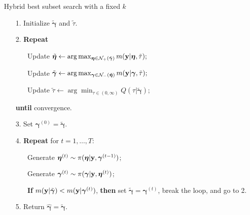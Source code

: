\documentclass[12pt]{article}
\def\uy{{\bf y}}
\def\bg{{\boldsymbol \gamma}}
\def\ueta{{\boldsymbol \eta}}
\def\ueta{{\boldsymbol \eta}}
\begin{document}
\begin{algorithm}[ht]
\caption{Hybrid best subset search with a fixed $k$}\label{alg:2}
\begin{itemize}
\item[1.] Initialize $\tilde{\bg}$ and $\tilde{\tau}$.
\item[2.] \textbf{Repeat}
\begin{itemize}
\item[] Update $\tilde{\ueta}\leftarrow \arg\max_{\ueta  \in \mathcal{N}_+(\tilde{\bg} ) } m(\uy|\ueta,\tilde{\tau});$ 
\item[] Update $\tilde{\bg}\leftarrow  \arg\max_{\bg  \in \mathcal{N}_-(\tilde{\ueta} ) } m(\uy|\bg,\tilde{\tau});$
\item[] Update $\tilde{\tau} \leftarrow \arg\min_{\tau \in (0,\infty)}Q(\tau|\tilde{\bg})$;
\end{itemize}
\item[] \textbf{until} convergence.
\item[3.] Set $\bg^{(0)}=\tilde{\bg}$.
\item[4.] \textbf{Repeat} for $t=1,\ldots,T$:
\begin{itemize}
\item[] Generate $\ueta^{(t)}\sim \pi(\ueta|\uy,\bg^{(t-1)})$;
\item[] Generate $\bg^{(t)}\sim \pi(\bg|\uy,\ueta^{(t)})$;
\item[] \textbf{If} $m(\uy|\tilde{\bg})<m(\uy|\bg^{(t)})$, \textbf{then} set $\tilde{\bg}=\bg^{(t)}$, break the loop, and go to 2.
\end{itemize}
\item[5.] Return $\hat{\bg}=\tilde{\bg}$.
\end{itemize}
\end{algorithm}
\end{document}
